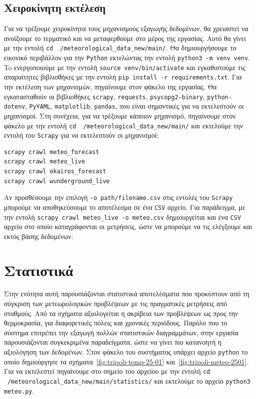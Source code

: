 \documentclass[a4paper,12pt]{article}
\begin{document}
\subsection{Χειροκίνητη εκτέλεση}\label{sec:manual_scraper_execution}
Για να τρέξουμε χειροκίνητα τους μηχανισμούς εξαγωγής δεδομένων, θα χρειαστεί να ανοίξουμε το τερματικό και να μεταφερθούμε στο μέρος της εργασίας. Αυτό θα γίνει με την εντολή \texttt{cd ~/meteorological\_data\_new/main/}. Θα δημιουργήσουμε το εικονικό περιβάλλον για την \texttt{Python} εκτελώντας την εντολή \texttt{python3 -m venv venv}. To ενεργοποιούμε με την εντολή \texttt{source venv/bin/activate} και εγκαθιστούμε τις απαραίτητες βιβλιοθήκες με την εντολή \texttt{pip install -r requirements.txt}. Για την εκτέλεση των μηχανισμών, πηγαίνουμε στον φάκελο της εργασίας. Θα εγκατασταθούν οι βιβλιοθήκες \texttt{scrapy}, \texttt{requests},  \texttt{psycopg2-binary}, \texttt{python-dotenv}, \texttt{PyYAML}, \texttt{matplotlib}, \texttt{pandas}, που είναι σημαντικές για να εκτελεστούν οι μηχανισμοί. Στη συνέχεια, για να τρέξουμε κάποιον μηχανισμό, πηγαίνουμε στον φάκελο με την εντολή \texttt{cd ~/meteorological\_data\_new/main/} και εκτελούμε την εντολή του \texttt{Scrapy} για να εκτελεστούν οι μηχανισμοί:

\begin{lstlisting}
scrapy crawl meteo_forecast
scrapy crawl meteo_live
scrapy crawl okairos_forecast
scrapy crawl wunderground_live
\end{lstlisting}

Αν προσθέσουμε την επιλογή \texttt{-o path/filename.csv} στις εντολές του \texttt{Scrapy} μπορούμε να αποθηκεύσουμε το αποτέλεσμα σε ένα \texttt{CSV} αρχείο. Για παράδειγμα, με την εντολή \texttt{scrapy crawl meteo\_live -o meteo.csv} δημιουργείται και ένα \texttt{CSV} αρχείο στο οποίο καταγράφονται οι μετρήσεις, ώστε να μπορούμε να τις ελέγξουμε και εκτός βάσης δεδομένων.

\section{Στατιστικά}\label{sec:res}
Στην ενότητα αυτή παρουσιάζονται στατιστικά αποτελέσματα που προκύπτουν από τη σύγκριση των μετεωρολογικών προβλέψεων με τις πραγματικές μετρήσεις από σταθμούς. Από τα σχήματα αξιολογείται η ακρίβεια των προβλέψεων ως προς την θερμοκρασία, για διαφορετικές πόλεις και χρονικές περιόδους. Παρόλο που το σύστημα επιτρέπει την εξαγωγή πολλών στατιστικών διαγραμμάτων, στην εργασία παρουσιάζονται συγκεκριμένα παραδείγματα, ώστε να γίνει πιο κατανοητή η αξιολόγηση των δεδομένων. Στον φάκελο του συστήματος υπάρχει αρχείο \texttt{python} το οποίο δημιούργησε τα σχήματα~\ref{fig:tripoli-temp-25-01} και~\ref{fig:tripoli-meteo-2501}. Για να εκτελεστεί πηγαίνουμε στο σημείο του αρχείου με την εντολή \texttt{cd ~/meteorological\_data\_new/main/statistics/} και εκτελούμε το αρχείο \texttt{python3 meteo.py}.
\end{document}
